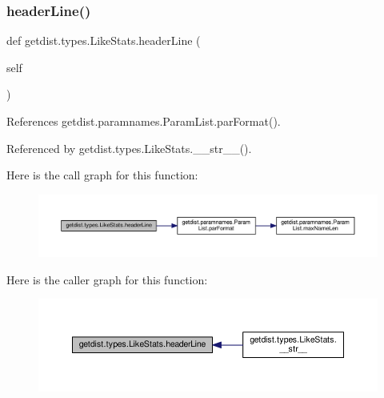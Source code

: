 \subsubsection{\texorpdfstring{header\+Line()}{headerLine()}}
{\footnotesize\ttfamily def getdist.\+types.\+Like\+Stats.\+header\+Line (\begin{DoxyParamCaption}\item[{}]{self }\end{DoxyParamCaption})}



References getdist.\+paramnames.\+Param\+List.\+par\+Format().



Referenced by getdist.\+types.\+Like\+Stats.\+\_\+\+\_\+str\+\_\+\+\_\+().

Here is the call graph for this function\+:
\nopagebreak
\begin{figure}[H]
\begin{center}
\leavevmode
\includegraphics[width=350pt]{classgetdist_1_1types_1_1LikeStats_affb93f8ca31099d4168b00a6beceb015_cgraph}
\end{center}
\end{figure}
Here is the caller graph for this function\+:
\nopagebreak
\begin{figure}[H]
\begin{center}
\leavevmode
\includegraphics[width=350pt]{classgetdist_1_1types_1_1LikeStats_affb93f8ca31099d4168b00a6beceb015_icgraph}
\end{center}
\end{figure}
\mbox{\label{classgetdist_1_1types_1_1LikeStats_a6aa2cc1ed178c43b46cdb529d9be5b1f}} 
